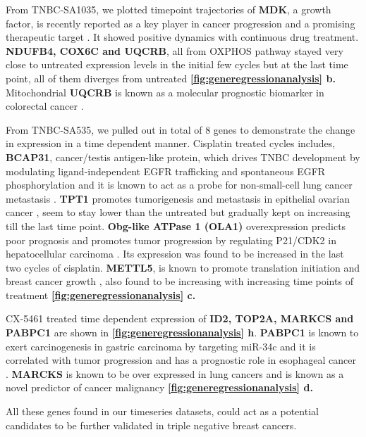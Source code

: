 From TNBC-SA1035, we plotted timepoint trajectories of \textbf{MDK}, a growth factor, is recently reported as a key player in cancer progression and a promising therapeutic target \cite{filippou2020midkine}. It showed positive dynamics with continuous drug treatment. 
\textbf{NDUFB4, COX6C and UQCRB}, all from \ac{OXPHOS} pathway stayed very close to untreated expression levels in the initial few cycles but at the last time point, all of them diverges from untreated \textbf{\autoref{fig:generegressionanalysis} b.} Mitochondrial \textbf{UQCRB} is known as a molecular prognostic biomarker in colorectal cancer \cite{kim2017mitochondrial}.

From TNBC-SA535, we pulled out in total of 8 genes to demonstrate the change in expression in a time dependent manner. Cisplatin treated cycles includes, \textbf{BCAP31}, cancer/testis antigen-like protein, which drives TNBC development by modulating ligand-independent EGFR trafficking and spontaneous EGFR phosphorylation and it is known to act as a probe for non-small-cell lung cancer metastasis
\cite{fu2019bcap31, wang2020bcap31}. \textbf{TPT1} promotes tumorigenesis and metastasis in epithelial ovarian cancer \cite{wu2019lncrna}, seem to stay lower than the untreated but gradually kept on increasing till the last time point. \textbf{Obg-like ATPase 1 (OLA1)} overexpression predicts poor prognosis and promotes tumor progression by regulating P21/CDK2 in hepatocellular carcinoma \cite{huang2020obg}. Its expression was found to be increased in the last two cycles of cisplatin. \textbf{METTL5}, is known to promote translation initiation and breast cancer growth \cite{zeng2020roles}, also found to be increasing with increasing time points of treatment \textbf{\autoref{fig:generegressionanalysis} c.}

CX-5461 treated time dependent expression of \textbf{ID2, TOP2A, MARKCS and PABPC1} are shown in \textbf{\autoref{fig:generegressionanalysis} h}.
\textbf{PABPC1} is known to exert carcinogenesis in gastric carcinoma by targeting miR-34c and it is correlated with tumor progression and has a prognostic role in esophageal cancer \cite{zhu2015pabpc1,takashima2006expression}. \textbf{MARCKS} is known to be over expressed in lung cancers and is known as a novel predictor of cancer malignancy \cite{reddy2014marcks, chen2014novel} \textbf{\autoref{fig:generegressionanalysis} d.}

All these genes found in our timeseries datasets, could act as a potential candidates to be further validated in triple negative breast cancers.

